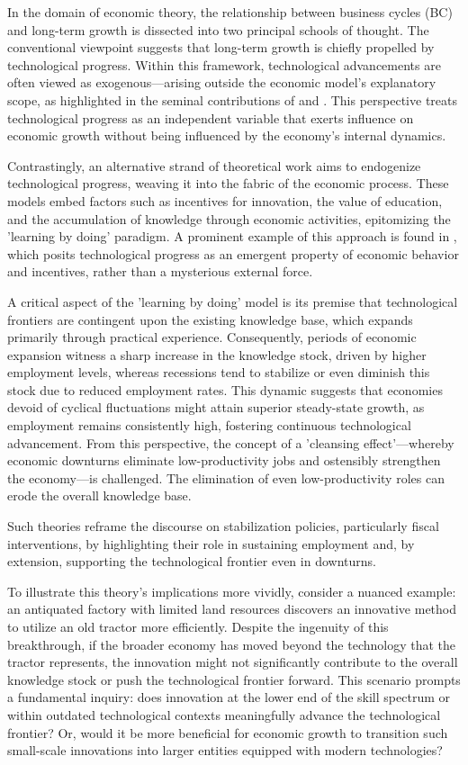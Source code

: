 \documentclass[12pt]{report}
\begin{document}
In the domain of economic theory, the relationship between business cycles (BC) and long-term growth is dissected into
two principal schools of thought. The conventional viewpoint suggests that long-term growth is chiefly propelled by
technological progress. Within this framework, technological advancements are often viewed as exogenous—arising outside
the economic model's explanatory scope, as highlighted in the seminal contributions of \cite{Sol56} and \cite{Swa56}.
This perspective treats technological progress as an independent variable that exerts influence on economic growth
without being influenced by the economy's internal dynamics. 

Contrastingly, an alternative strand of theoretical work aims to endogenize technological progress, weaving it into the
fabric of the economic process. These models embed factors such as incentives for innovation, the value of education,
and the accumulation of knowledge through economic activities, epitomizing the 'learning by doing' paradigm. A prominent
example of this approach is found in \cite{Sta90}, which posits technological progress as an emergent property of
economic behavior and incentives, rather than a mysterious external force. 

A critical aspect of the 'learning by doing' model is its premise that technological frontiers are contingent upon the
existing knowledge base, which expands primarily through practical experience. Consequently, periods of economic
expansion witness a sharp increase in the knowledge stock, driven by higher employment levels, whereas recessions tend
to stabilize or even diminish this stock due to reduced employment rates. This dynamic suggests that economies devoid of
cyclical fluctuations might attain superior steady-state growth, as employment remains consistently high, fostering
continuous technological advancement. From this perspective, the concept of a 'cleansing effect'—whereby economic
downturns eliminate low-productivity jobs and ostensibly strengthen the economy—is challenged. The elimination of even
low-productivity roles can erode the overall knowledge base. 

Such theories reframe the discourse on stabilization policies, particularly fiscal interventions, by highlighting their
role in sustaining employment and, by extension, supporting the technological frontier even in downturns. 

To illustrate this theory's implications more vividly, consider a nuanced example: an antiquated factory with limited
land resources discovers an innovative method to utilize an old tractor more efficiently. Despite the ingenuity of this
breakthrough, if the broader economy has moved beyond the technology that the tractor represents, the innovation might
not significantly contribute to the overall knowledge stock or push the technological frontier forward. This scenario
prompts a fundamental inquiry: does innovation at the lower end of the skill spectrum or within outdated technological
contexts meaningfully advance the technological frontier? Or, would it be more beneficial for economic growth to
transition such small-scale innovations into larger entities equipped with modern technologies? 
\end{document}
